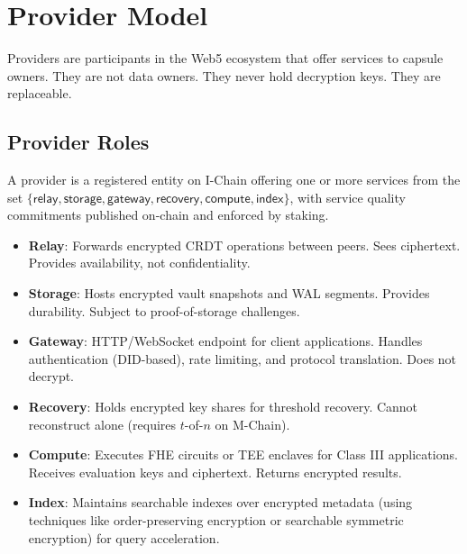 

\section{Provider Model}
\label{sec:providers}

Providers are participants in the Web5 ecosystem that offer services to capsule
owners. They are not data owners. They never hold decryption keys. They are
replaceable.

\subsection{Provider Roles}

\begin{definition}[Provider]\label{def:provider}
A provider is a registered entity on I-Chain offering one or more services from
the set $\{\mathsf{relay}, \mathsf{storage}, \mathsf{gateway}, \mathsf{recovery},
\mathsf{compute}, \mathsf{index}\}$, with service quality commitments published
on-chain and enforced by staking.
\end{definition}

\begin{itemize}[nosep]
  \item \textbf{Relay}: Forwards encrypted CRDT operations between peers.
        Sees ciphertext. Provides availability, not confidentiality.
  \item \textbf{Storage}: Hosts encrypted vault snapshots and WAL segments.
        Provides durability. Subject to proof-of-storage challenges.
  \item \textbf{Gateway}: HTTP/WebSocket endpoint for client applications.
        Handles authentication (DID-based), rate limiting, and protocol
        translation. Does not decrypt.
  \item \textbf{Recovery}: Holds encrypted key shares for threshold recovery.
        Cannot reconstruct alone (requires $t$-of-$n$ on M-Chain).
  \item \textbf{Compute}: Executes FHE circuits or TEE enclaves for Class III
        applications. Receives evaluation keys and ciphertext. Returns encrypted
        results.
  \item \textbf{Index}: Maintains searchable indexes over encrypted metadata
        (using techniques like order-preserving encryption or searchable
        symmetric encryption) for query acceleration.
\end{itemize}

